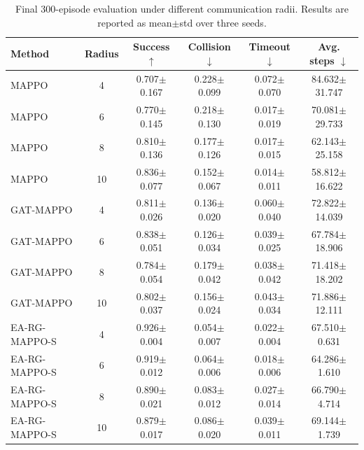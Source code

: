 \begin{table}[t]
\centering
\caption{Final 300-episode evaluation under different communication radii. Results are reported as mean$\pm$std over three seeds.}
\label{tab:final_comm_300_results}
\begin{tabular}{lccccc}
\toprule
Method & Radius & Success $\uparrow$ & Collision $\downarrow$ & Timeout $\downarrow$ & Avg. steps $\downarrow$ \\
\midrule
MAPPO & 4 & 0.707$\pm$0.167 & 0.228$\pm$0.099 & 0.072$\pm$0.070 & 84.632$\pm$31.747 \\
MAPPO & 6 & 0.770$\pm$0.145 & 0.218$\pm$0.130 & 0.017$\pm$0.019 & 70.081$\pm$29.733 \\
MAPPO & 8 & 0.810$\pm$0.136 & 0.177$\pm$0.126 & 0.017$\pm$0.015 & 62.143$\pm$25.158 \\
MAPPO & 10 & 0.836$\pm$0.077 & 0.152$\pm$0.067 & 0.014$\pm$0.011 & 58.812$\pm$16.622 \\
\midrule
GAT-MAPPO & 4 & 0.811$\pm$0.026 & 0.136$\pm$0.020 & 0.060$\pm$0.040 & 72.822$\pm$14.039 \\
GAT-MAPPO & 6 & 0.838$\pm$0.051 & 0.126$\pm$0.034 & 0.039$\pm$0.025 & 67.784$\pm$18.906 \\
GAT-MAPPO & 8 & 0.784$\pm$0.054 & 0.179$\pm$0.042 & 0.038$\pm$0.042 & 71.418$\pm$18.202 \\
GAT-MAPPO & 10 & 0.802$\pm$0.037 & 0.156$\pm$0.024 & 0.043$\pm$0.034 & 71.886$\pm$12.111 \\
\midrule
EA-RG-MAPPO-S & 4 & 0.926$\pm$0.004 & 0.054$\pm$0.007 & 0.022$\pm$0.004 & 67.510$\pm$0.631 \\
EA-RG-MAPPO-S & 6 & 0.919$\pm$0.012 & 0.064$\pm$0.006 & 0.018$\pm$0.006 & 64.286$\pm$1.610 \\
EA-RG-MAPPO-S & 8 & 0.890$\pm$0.021 & 0.083$\pm$0.012 & 0.027$\pm$0.014 & 66.790$\pm$4.714 \\
EA-RG-MAPPO-S & 10 & 0.879$\pm$0.017 & 0.086$\pm$0.020 & 0.039$\pm$0.011 & 69.144$\pm$1.739 \\
\bottomrule
\end{tabular}
\end{table}
